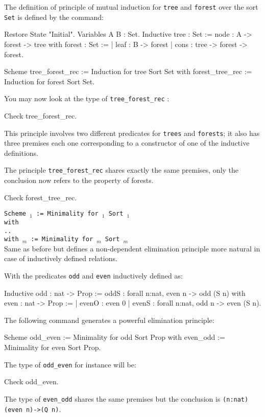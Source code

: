 \Example
The definition of principle of mutual induction for {\tt tree} and
{\tt forest} over the sort {\tt Set} is defined by the command:
\begin{coq_eval}
Restore State "Initial".
Variables A B : Set.
Inductive tree : Set :=
    node : A -> forest -> tree
with forest : Set :=
  | leaf : B -> forest
  | cons : tree -> forest -> forest.
\end{coq_eval}
\begin{coq_example*}
Scheme tree_forest_rec := Induction for tree
  Sort Set
  with forest_tree_rec := Induction for forest Sort Set.
\end{coq_example*}
You may now look at the type of {\tt tree\_forest\_rec} :
\begin{coq_example}
Check tree_forest_rec.
\end{coq_example}
This principle involves two different predicates for {\tt trees} and
{\tt forests}; it also has three premises each one corresponding to a
constructor of one of the inductive definitions.

The principle {\tt tree\_forest\_rec} shares exactly the same
premises, only the conclusion now refers to the property of forests.
\begin{coq_example}
Check forest_tree_rec.
\end{coq_example}

\begin{Variant}
\item {\tt Scheme {\ident$_1$} := Minimality for \term$_1$ Sort {\sort$_1$} \\
  with\\
  \mbox{}\hspace{0.1cm} .. \\
        with {\ident$_m$} := Minimality for {\term$_m$} Sort
        {\sort$_m$}}\\
Same as before but defines a non-dependent elimination principle more
natural in case of inductively defined relations. 
\end{Variant}

\Example
With the predicates {\tt odd} and {\tt even} inductively defined as:
\begin{coq_example*}
Inductive odd : nat -> Prop :=
    oddS : forall n:nat, even n -> odd (S n)
with even : nat -> Prop :=
  | evenO : even 0%
  | evenS : forall n:nat, odd n -> even (S n).
\end{coq_example*}
The following command generates a powerful elimination
principle:
\begin{coq_example*}
Scheme odd_even := Minimality for   odd Sort Prop
  with even_odd := Minimality for even Sort Prop.
\end{coq_example*}
The type of {\tt odd\_even} for instance will be:
\begin{coq_example}
Check odd_even.
\end{coq_example}
The type of {\tt even\_odd} shares the same premises but the
conclusion is {\tt (n:nat)(even n)->(Q n)}.

